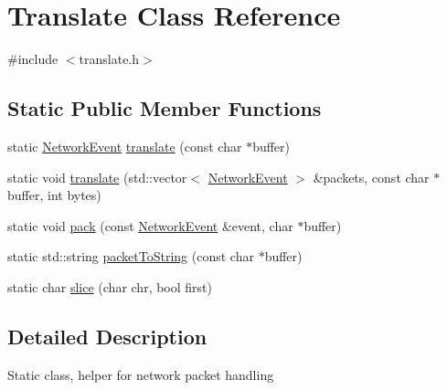 \hypertarget{class_translate}{\section{Translate Class Reference}
\label{class_translate}
}


{\ttfamily \#include $<$translate.\-h$>$}

\subsection*{Static Public Member Functions}
\begin{DoxyCompactItemize}
\item 
static \hyperlink{class_network_event}{Network\-Event} \hyperlink{class_translate_a7f99b4f8bc182e74931ba5b580de0842}{translate} (const char $\ast$buffer)
\item 
static void \hyperlink{class_translate_a251bfff8f099675f475fb96cbf629cbc}{translate} (std\-::vector$<$ \hyperlink{class_network_event}{Network\-Event} $>$ \&packets, const char $\ast$buffer, int bytes)
\item 
static void \hyperlink{class_translate_a5a0f76442c0c9a1ff0286109270b93da}{pack} (const \hyperlink{class_network_event}{Network\-Event} \&event, char $\ast$buffer)
\item 
static std\-::string \hyperlink{class_translate_a02e63cb5dbd8cc0759f5928cb2b435e4}{packet\-To\-String} (const char $\ast$buffer)
\item 
static char \hyperlink{class_translate_ab50f2648928eb66ded569f290afe1633}{slice} (char chr, bool first)
\end{DoxyCompactItemize}


\subsection{Detailed Description}
Static class, helper for network packet handling 

